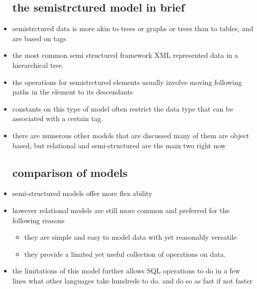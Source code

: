 \documentclass{article}
\begin{document}
\begin{itemize}
\subsection{the semistrctured model in brief}
\item semistrctured data is more akin to trees or graphs or trees than to tables, and are based on tags 
\item the most common semi structured framework XML represented data in a hierarchical tree.
\item the operations for semistrctured elements usually involve moving following paths in the element to its descendants
\item constants on this type of model often restrict the data type that can be associated with a certain tag. 
\item there are numerous other models that are discussed many of them are object based, but relational and semi-structured are the main two right now 
\subsection{comparison of models}
\item semi-structured models offer more flex ability 
\item however relational models are still more common and preferred for the following reasons
\begin{itemize}
    \item they are simple and easy to model data with yet reasonably versatile
    \item they provide a limited yet useful collection of operations on data.
\end{itemize}
\item the limitations of this model further allows SQL operations to do in a few lines what other languages take hundreds to do. and do so as fast if not faster

\end{itemize}
\end{document}

